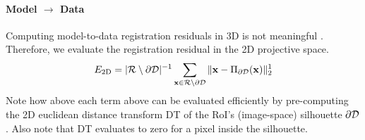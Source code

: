 \paragraph{Model $\rightarrow$ Data}
Computing model-to-data registration residuals in 3D is not meaningful . Therefore, we evaluate the registration residual in the 2D projective space. 
\begin{eqnarray}
E_\text{2D} = |\mathcal{R} \setminus \partial\mathcal{D}|^{-1} 
\sum_{\mathbf{x} \in \mathcal{R} \setminus \partial\mathcal{D}} \| \mathbf{x} - \Pi_{\partial\mathcal{D}}(\mathbf{x}) \|^1_2
\label{eq:metric2}
\end{eqnarray}
Note how above each term above can be evaluated efficiently by pre-computing the 2D euclidean distance transform DT of the RoI's (image-space) silhouette $\partial \mathcal{D}$. Also note that DT evaluates to zero for a pixel inside the silhouette. 


